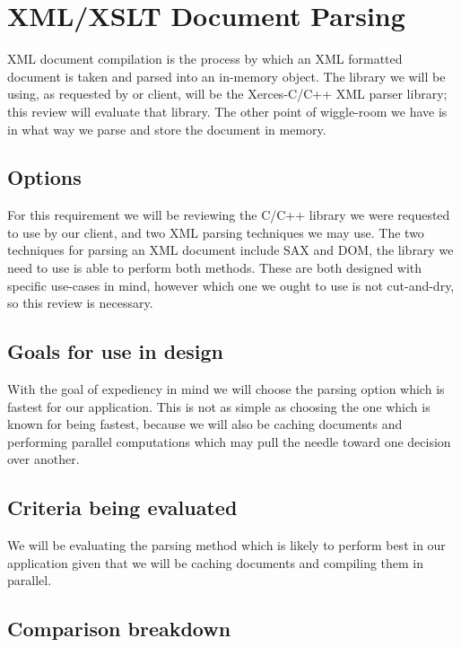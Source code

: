 \section{XML/XSLT Document Parsing}

XML document compilation is the process by which an XML formatted document is taken and parsed into an in-memory object.
The library we will be using, as requested by or client, will be the Xerces-C/C++ XML parser library; this review will evaluate that library.
The other point of wiggle-room we have is in what way we parse and store the document in memory.

\subsection{Options}

For this requirement we will be reviewing the C/C++ library we were requested to use by our client, and two XML parsing techniques we may use.
The two techniques for parsing an XML document include SAX and DOM, the library we need to use is able to perform both methods.
These are both designed with specific use-cases in mind, however which one we ought to use is not cut-and-dry, so this review is necessary.

\subsection{Goals for use in design}

With the goal of expediency in mind we will choose the parsing option which is fastest for our application.
This is not as simple as choosing the one which is known for being fastest, because we will also be caching documents and performing parallel computations which may pull the needle toward one decision over another.

\subsection{Criteria being evaluated}

We will be evaluating the parsing method which is likely to perform best in our application given that we will be caching documents and compiling them in parallel.

\subsection{Comparison breakdown}

